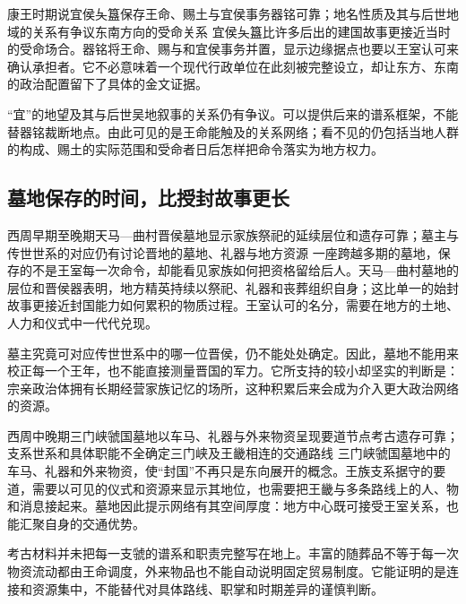 \begin{event}{康王时期说}{宜侯夨簋保存王命、赐土与宜侯事务}{器铭可靠；地名性质及其与后世地域的关系有争议}{东南方向的受命关系}
宜侯夨簋比许多后出的建国故事更接近当时的受命场合。器铭将王命、赐与和宜侯事务并置，显示边缘据点也要以王室认可来确认承担者。它不必意味着一个现代行政单位在此刻被完整设立，却让东方、东南的政治配置留下了具体的金文证据。

“宜”的地望及其与后世吴地叙事的关系仍有争议。可以提供后来的谱系框架，不能替器铭裁断地点。由此可见的是王命能触及的关系网络；看不见的仍包括当地人群的构成、赐土的实际范围和受命者日后怎样把命令落实为地方权力。
\end{event}

\subsection{墓地保存的时间，比授封故事更长}

\begin{event}{西周早期至晚期}{天马—曲村晋侯墓地显示家族祭祀的延续}{层位和遗存可靠；墓主与传世世系的对应仍有讨论}{晋地的墓地、礼器与地方资源}
一座跨越多期的墓地，保存的不是王室每一次命令，却能看见家族如何把资格留给后人。天马—曲村墓地的层位和晋侯器表明，地方精英持续以祭祀、礼器和丧葬组织自身；这比单一的始封故事更接近封国能力如何累积的物质过程。王室认可的名分，需要在地方的土地、人力和仪式中一代代兑现。

墓主究竟可对应传世世系中的哪一位晋侯，仍不能处处确定。因此，墓地不能用来校正每一个王年，也不能直接测量晋国的军力。它所支持的较小却坚实的判断是：宗亲政治体拥有长期经营家族记忆的场所，这种积累后来会成为介入更大政治网络的资源。
\end{event}

\begin{event}{西周中晚期}{三门峡虢国墓地以车马、礼器与外来物资呈现要道节点}{考古遗存可靠；支系世系和具体职能不全确定}{三门峡及王畿相连的交通路线}
三门峡虢国墓地中的车马、礼器和外来物资，使“封国”不再只是东向展开的概念。王族支系据守的要道，需要以可见的仪式和资源来显示其地位，也需要把王畿与多条路线上的人、物和消息接起来。墓地因此提示网络有其空间厚度：地方中心既可接受王室关系，也能汇聚自身的交通优势。

考古材料并未把每一支虢的谱系和职责完整写在地上。丰富的随葬品不等于每一次物资流动都由王命调度，外来物品也不能自动说明固定贸易制度。它能证明的是连接和资源集中，不能替代对具体路线、职掌和时期差异的谨慎判断。
\end{event}

